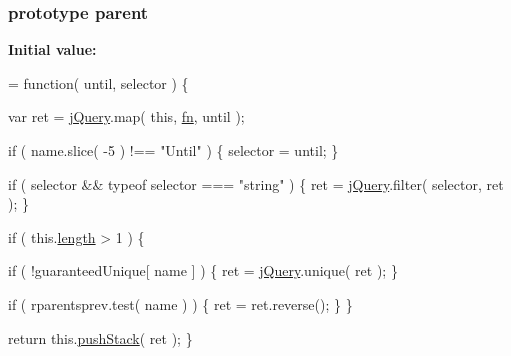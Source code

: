\subsubsection[{parent}]{ {\bf prototype} parent}\label{jquery-1_810_82-vsdoc_8js_aed9b5e7a755bcccb282f9b06c00a6822}
{\bfseries Initial value\+:}
\begin{DoxyCode}
= \textcolor{keyword}{function}( until, selector ) \{


        var ret = \hyperlink{jquery-1_810_82-vsdoc_8js_add5237586d970a38a81f990e8eb28c6c}{jQuery}.map( \textcolor{keyword}{this}, \hyperlink{jquery-1_810_82-vsdoc_8js_acef6bdaf6b9b20fdcca1ea86f0902c3b}{fn}, until );

        \textcolor{keywordflow}{if} ( name.slice( -5 ) !== \textcolor{stringliteral}{"Until"} ) \{
            selector = until;
        \}

        \textcolor{keywordflow}{if} ( selector && typeof selector === \textcolor{stringliteral}{"string"} ) \{
            ret = \hyperlink{jquery-1_810_82-vsdoc_8js_add5237586d970a38a81f990e8eb28c6c}{jQuery}.filter( selector, ret );
        \}

        \textcolor{keywordflow}{if} ( this.\hyperlink{jquery-1_810_82-vsdoc_8js_aa7de35d58da66d9944ab9cbe82c19640}{length} > 1 ) \{
            
            \textcolor{keywordflow}{if} ( !guaranteedUnique[ name ] ) \{
                ret = \hyperlink{jquery-1_810_82-vsdoc_8js_add5237586d970a38a81f990e8eb28c6c}{jQuery}.unique( ret );
            \}

            
            \textcolor{keywordflow}{if} ( rparentsprev.test( name ) ) \{
                ret = ret.reverse();
            \}
        \}

        \textcolor{keywordflow}{return} this.\hyperlink{jquery-1_810_82-vsdoc_8js_afc3a7db1ef2b526338c06c07cecccd44}{pushStack}( ret );
    \}
\end{DoxyCode}
\hypertarget{jquery-1_810_82-vsdoc_8js_a73895b5ab8d34f0181c620bc3a166cad}{}
